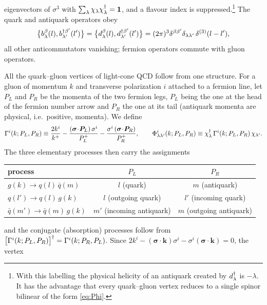 eigenvectors of $\sigma^{3}$ with $\sum_{\lambda}\chi_{\lambda}\chi^{\dagger}_{\lambda}=\mathbf 1$, and a
flavour index is suppressed.\footnote{With this labelling the physical helicity of an antiquark
created by $d^{\dagger}_{\lambda}$ is $-\lambda$. It has the advantage that every quark--gluon vertex
reduces to a single spinor bilinear of the form \eqref{eq:Phi}.} The quark and antiquark
operators obey
\begin{equation}
\big\{b^{\beta}_{\lambda}(l),b^{\dagger\beta'}_{\lambda'}(l')\big\}
=\big\{d^{\beta}_{\lambda}(l),d^{\dagger\beta'}_{\lambda'}(l')\big\}
=(2\pi)^{3}\delta^{\beta\beta'}\delta_{\lambda\lambda'}\,\delta^{(3)}(l-l'),
\label{eq:bb}
\end{equation}
all other anticommutators vanishing; fermion operators commute with gluon operators.

All the quark--gluon vertices of light-cone QCD follow from one structure. For a gluon of
momentum $k$ and transverse polarization $i$ attached to a fermion line, let $P_{L}$ and $P_{R}$
be the momenta of the two fermion legs, $P_{L}$ being the one at the head of the fermion number
arrow and $P_{R}$ the one at its tail (antiquark momenta are physical, i.e.\ positive, momenta).
We define
\begin{equation}
\Gamma^{i}(k;P_{L},P_{R})\equiv\frac{2k^{i}}{k^{+}}
-\frac{(\bm\sigma\!\cdot\!\bm P_{L})\,\sigma^{i}}{P_{L}^{+}}
-\frac{\sigma^{i}\,(\bm\sigma\!\cdot\!\bm P_{R})}{P_{R}^{+}},
\qquad
\Phi^{i}_{\lambda\lambda'}(k;P_{L},P_{R})\equiv\chi^{\dagger}_{\lambda}\,\Gamma^{i}(k;P_{L},P_{R})\,\chi_{\lambda'} .
\label{eq:Phi}
\end{equation}
The three elementary processes then carry the assignments
\begin{center}
\begin{tabular}{lcc}
\toprule
process & $P_{L}$ & $P_{R}$\\\midrule
$g(k)\to q(l)\,\bar q(m)$ & $l$ (quark) & $m$ (antiquark)\\
$q(l')\to q(l)\,g(k)$ & $l$ (outgoing quark) & $l'$ (incoming quark)\\
$\bar q(m')\to\bar q(m)\,g(k)$ & $m'$ (incoming antiquark) & $m$ (outgoing antiquark)\\
\bottomrule
\end{tabular}
\end{center}
and the conjugate (absorption) processes follow from $\big[\Gamma^{i}(k;P_{L},P_{R})\big]^{\dagger}
=\Gamma^{i}(k;P_{R},P_{L})$. Since
$2k^{i}-(\bm\sigma\!\cdot\!\bm k)\sigma^{i}-\sigma^{i}(\bm\sigma\!\cdot\!\bm k)=0$, the vertex
